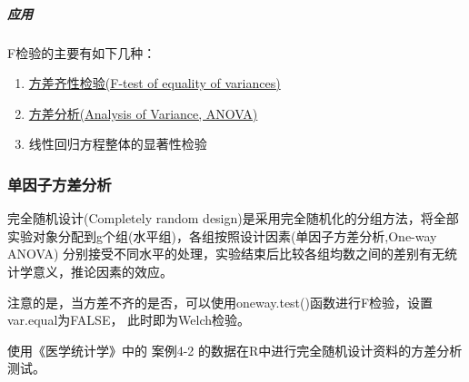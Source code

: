 \documentclass[
]{article}
\providecommand{\tightlist}{%
  \setlength{\itemsep}{0pt}\setlength{\parskip}{0pt}}
\begin{document}
\hypertarget{ux5e94ux7528}{%
\subparagraph{应用}\label{ux5e94ux7528}}

F检验的主要有如下几种：

\begin{enumerate}
\def\labelenumi{\arabic{enumi}.}
\tightlist
\item
  \protect\hyperlink{ux4e24ux6837ux672cux65b9ux5deeux9f50ux6027ux68c0ux9a8c}{方差齐性检验(F-test of equality of variances)}
\item
  \protect\hyperlink{ux65b9ux5deeux5206ux6790}{方差分析(Analysis of Variance, ANOVA)}
\item
  线性回归方程整体的显著性检验
\end{enumerate}

\hypertarget{ux5355ux56e0ux5b50ux65b9ux5deeux5206ux6790}{%
\subsubsection{单因子方差分析}\label{ux5355ux56e0ux5b50ux65b9ux5deeux5206ux6790}}

完全随机设计(Completely random design)是采用完全随机化的分组方法，将全部实验对象分配到g个组(水平组)，各组按照设计因素(单因子方差分析,One-way ANOVA)
分别接受不同水平的处理，实验结束后比较各组均数之间的差别有无统计学意义，推论因素的效应。

注意的是，当方差不齐的是否，可以使用oneway.test()函数进行F检验，设置var.equal为FALSE，
此时即为Welch检验。

使用《医学统计学》中的 案例4-2 的数据在R中进行完全随机设计资料的方差分析测试。
\end{document}
